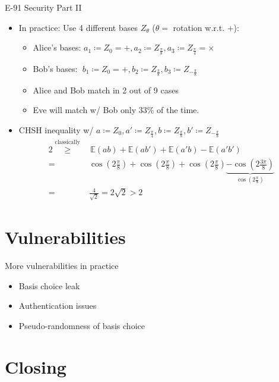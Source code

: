 \documentclass{beamer}
\begin{document}
	\begin{frame}{E-91 Security Part II}
		\begin{itemize}
			\item In practice: Use 4 different bases $Z_\theta$ ($\theta =$ rotation w.r.t. $+$):
				\begin{itemize}
					\item Alice's bases: $a_1 \coloneqq Z_0 = +, a_2 \coloneqq Z_{\frac{\pi}{8}}, a_3 \coloneqq Z_{\frac{\pi}{4}} = \times$
					\item Bob's bases: $\;b_1 \coloneqq Z_0 = +, b_2 \coloneqq Z_{\frac{\pi}{8}}, b_3 \coloneqq Z_{-\frac{\pi}{8}}$
					\item Alice and Bob match in 2 out of 9 cases
					\item Eve will match w/ Bob only 33\% of the time.
				\end{itemize}
			\item<2-> CHSH inequality w/ $a \coloneqq Z_0, a' \coloneqq Z_{\frac{\pi}{4}}, b \coloneqq Z_{\frac{\pi}{8}}, b' \coloneqq Z_{-\frac{\pi}{8}}$
				\begin{align*}
					2 \overset{\text{classically}}{\geq}&\, \mathbb{E}(a b) + \mathbb{E}(a b') + \mathbb{E}(a' b) - \mathbb{E}(a' b') \\
					=& \cos(2\frac{\pi}{8}) + \cos(2\frac{\pi}{8}) + \cos(2\frac{\pi}{8}) \underbrace{- \cos(2\frac{3\pi}{8})}_{\cos(2\frac{\pi}{8})} \\
					=& \frac{4}{\sqrt{2}} = 2\sqrt{2} > 2
				\end{align*}
		\end{itemize}
	\end{frame}

	\section{Vulnerabilities}

	\begin{frame}{More vulnerabilities in practice} %
		\begin{itemize}
			\item Basis choice leak							
			\item Authentication issues
			\item Pseudo-randomness of basis choice
		\end{itemize}
	\end{frame}

	\section{Closing}
\end{document}
